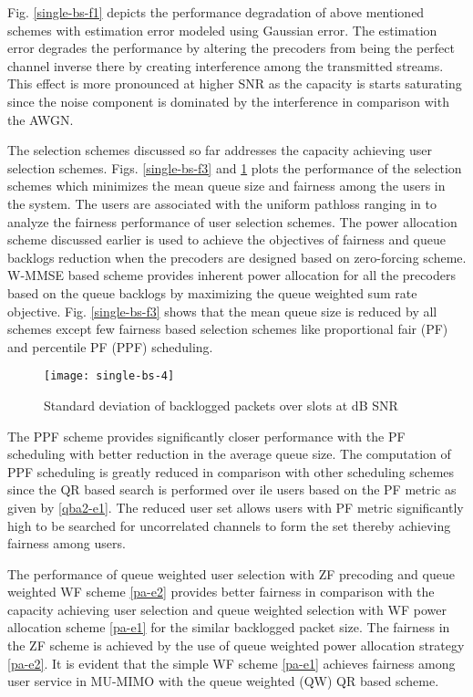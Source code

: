 Fig. \ref{single-bs-f1} depicts the performance degradation of above mentioned schemes with  estimation error modeled using Gaussian error. The estimation error degrades the performance by altering the precoders from being the perfect channel inverse there by creating interference among the transmitted streams. This effect is more pronounced at higher SNR as the capacity is starts saturating since the noise component is dominated by the interference in comparison with the AWGN.

The selection schemes discussed so far addresses the capacity achieving user selection schemes. Figs. \ref{single-bs-f3} and \ref{single-bs-f4} plots the performance of the selection schemes which minimizes the mean queue size and fairness among the users in the system. The users are associated with the uniform pathloss ranging in  to analyze the fairness performance of user selection schemes. The power allocation scheme discussed earlier is used to achieve the objectives of fairness and queue backlogs reduction when the precoders are designed based on zero-forcing scheme. W-MMSE based scheme provides inherent power allocation for all the precoders based on the queue backlogs by maximizing the queue weighted sum rate objective. Fig. \ref{single-bs-f3} shows that the mean queue size is reduced by all schemes except few fairness based selection schemes like proportional fair (PF) and percentile PF (PPF) scheduling.
\begin{figure}
\centering
\texttt{[image: single-bs-4]}
\caption[short]{Standard deviation of backlogged packets  over  slots at dB SNR}
\label{single-bs-f4}
\end{figure}

The PPF scheme provides significantly closer performance with the PF scheduling with better reduction in the average queue size. The computation of PPF scheduling is greatly reduced in comparison with other scheduling schemes since the QR based search is performed over ile users based on the PF metric as given by \eqref{qba2-e1}. The reduced user set allows users with PF metric significantly high to be searched for uncorrelated channels to form the set  thereby achieving fairness among users.

The performance of queue weighted user selection with ZF precoding and queue weighted WF scheme \eqref{pa-e2} provides better fairness in comparison with the capacity achieving user selection and queue weighted selection with WF power allocation scheme \eqref{pa-e1} for the similar backlogged packet size. The fairness in the ZF scheme is achieved by the use of queue weighted power allocation strategy \eqref{pa-e2}. It is evident that the simple WF scheme \eqref{pa-e1} achieves fairness among user service in MU-MIMO with the queue weighted (QW) QR based scheme.

